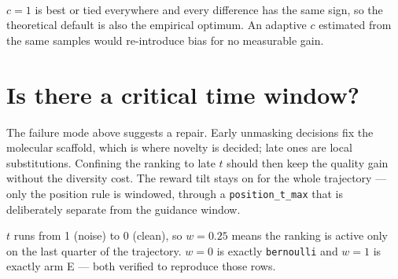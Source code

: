 \documentclass[11pt]{article}
\begin{document}
\begin{table}[htbp]
\centering
\small
{}
\\[0.4em] \begin{minipage}{0.92\textwidth}\footnotesize $c=1$ is best or tied everywhere and every difference has the same sign, so the theoretical default is also the empirical optimum. An adaptive $c$ estimated from the same samples would re-introduce bias for no measurable gain.\end{minipage}
\caption{ring count: sweeping the control-variate coefficient, 15 runs per $c$. $c$ is not restricted to $[0,1]$ --- $\mathrm{Cov}/\mathrm{Var}$ can exceed $1$.}
\label{tab:conf-c-ring_count}
\end{table}

\section{Is there a critical time window?}

The failure mode above suggests a repair. Early unmasking decisions fix the
molecular scaffold, which is where novelty is decided; late ones are local
substitutions. Confining the ranking to late $t$ should then keep the quality
gain without the diversity cost. The reward tilt stays on for the whole
trajectory --- only the position rule is windowed, through a
\texttt{position\_t\_max} that is deliberately separate from the guidance window.

$t$ runs from 1 (noise) to 0 (clean), so $w = 0.25$ means the ranking is active
only on the last quarter of the trajectory. $w=0$ is exactly \texttt{bernoulli}
and $w=1$ is exactly arm E --- both verified to reproduce those rows.
\end{document}
